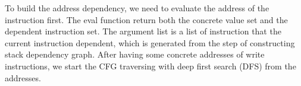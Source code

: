 \documentclass{article}
\begin{document}
\begin{vAlgorithm}[]{0.52\textwidth}{1em}
\end{vAlgorithm}


To build the address dependency, we need to evaluate the address of the instruction first. The eval function return both the concrete value set and the dependent instruction set. The argument list is a list of instruction that the current instruction dependent, which is generated from the step of constructing stack dependency graph. After having some concrete addresses of write instructions, we start the CFG traversing with deep first search (DFS) from the addresses.
\end{document}
